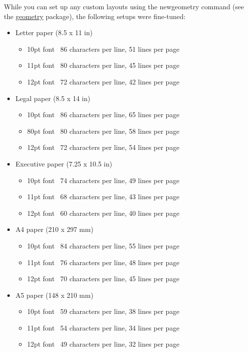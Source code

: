 \documentclass[english,12pt,openany,letterpaper]{book}
\begin{document}
While you can set up any custom layouts using the \bs newgeometry command (see the \href{https://www.ctan.org/pkg/geometry}{geometry} package), the following setups were fine-tuned:
\begin{itemize}
	\item Letter paper (8.5 x 11 in)
	\begin{itemize}
		\item 10pt font \dash\ 86 characters per line, 51 lines per page
		\item 11pt font \dash\ 80 characters per line, 45 lines per page
		\item 12pt font \dash\ 72 characters per line, 42 lines per page
	\end{itemize}
	\item Legal paper (8.5 x 14 in)
	\begin{itemize}
		\item 10pt font \dash\ 86 characters per line, 65 lines per page
		\item 80pt font \dash\ 80 characters per line, 58 lines per page
		\item 12pt font \dash\ 72 characters per line, 54 lines per page
	\end{itemize}
	\item Executive paper (7.25 x 10.5 in)
	\begin{itemize}
		\item 10pt font \dash\ 74 characters per line, 49 lines per page
		\item 11pt font \dash\ 68 characters per line, 43 lines per page
		\item 12pt font \dash\ 60 characters per line, 40 lines per page
	\end{itemize}
	\item A4 paper (210 x 297 mm)
	\begin{itemize}
		\item 10pt font \dash\ 84 characters per line, 55 lines per page
		\item 11pt font \dash\ 76 characters per line, 48 lines per page
		\item 12pt font \dash\ 70 characters per line, 45 lines per page
	\end{itemize}
	\item A5 paper (148 x 210 mm)
	\begin{itemize}
		\item 10pt font \dash\ 59 characters per line, 38 lines per page
		\item 11pt font \dash\ 54 characters per line, 34 lines per page
		\item 12pt font \dash\ 49 characters per line, 32 lines per page
	\end{itemize}
\end{itemize}
\end{document}
